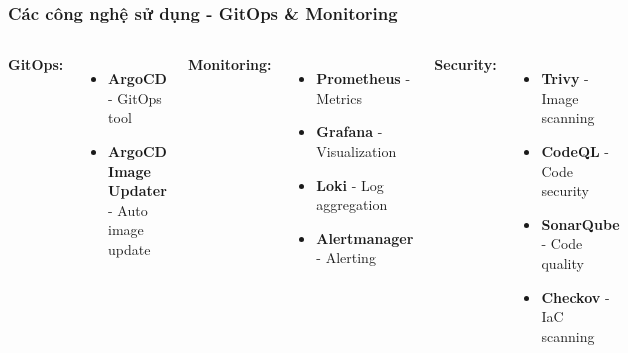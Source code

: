 \documentclass[aspectratio=169]{beamer}
\begin{document}
\begin{frame}
\frametitle{Các công nghệ sử dụng - GitOps \& Monitoring}
\begin{columns}
\textbf{GitOps:}
\begin{itemize}
    \item \textcolor{k8sblue}{\textbf{ArgoCD}} - GitOps tool
    \item \textbf{ArgoCD Image Updater} - Auto image update
\end{itemize}

\vspace{0.3cm}
\textbf{Monitoring:}
\begin{itemize}
    \item \textbf{Prometheus} - Metrics
    \item \textbf{Grafana} - Visualization
    \item \textbf{Loki} - Log aggregation
    \item \textbf{Alertmanager} - Alerting
\end{itemize}

\textbf{Security:}
\begin{itemize}
    \item \textbf{Trivy} - Image scanning
    \item \textbf{CodeQL} - Code security
    \item \textbf{SonarQube} - Code quality
    \item \textbf{Checkov} - IaC scanning
\end{itemize}
\end{columns}
\end{frame}
\end{document}
